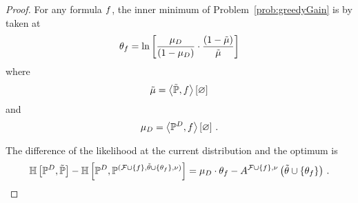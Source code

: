 \begin{proof}
    For any formula $f$, the inner minimum of Problem~\eqref{prob:greedyGain} is by  taken at
    \[ \theta_{f} = \ln \left[ \frac{\mu_{D}}{(1-\mu_{D})}\cdot \frac{(1-\tilde{\mu})}{\tilde{\mu}} \right]  \]
    where
    \[ \tilde{\mu} = \left\langle \tilde{\mathbb{P}},f\right\rangle \left[ \varnothing \right] \]
    and
    \[ \mu_{D} = \left\langle \mathbb{P}^{D},f\right\rangle \left[ \varnothing \right] \, . \]

    The difference of the likelihood at the current distribution and the optimum is
    \begin{align*}
        \mathbb{H}\left[\mathbb{P}^{D},\tilde{\mathbb{P}}\right]
        - \mathbb{H}\left[\mathbb{P}^{D},\mathbb{P}^{(\mathcal{F}\cup\{f\},\tilde{\theta}\cup\{\theta_{f}\},\nu)}\right]
        = \mu_{D} \cdot \theta_{f} - A^{\mathcal{F}\cup\{f\},\nu}\left(\tilde{\theta}\cup\{\theta_{f}\}\right) \, .
    \end{align*}


\end{proof}
